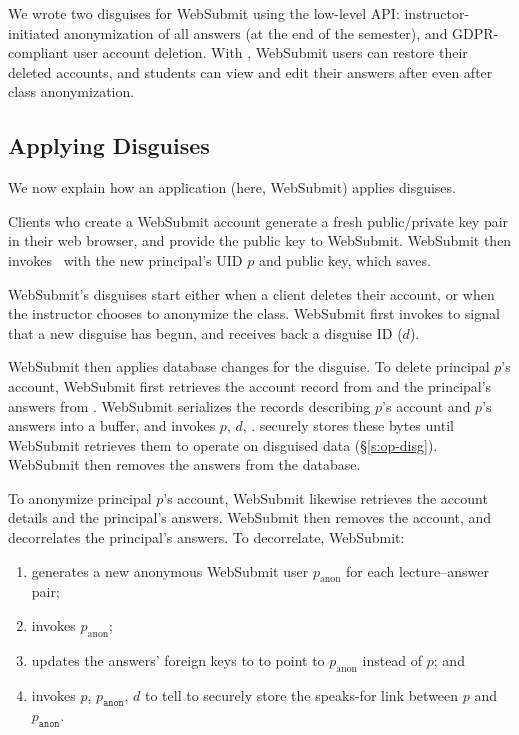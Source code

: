 %
We wrote two disguises for WebSubmit using the low-level API: \one{}
instructor-initiated anonymization of all answers (\eg at the end of the semester),
and \two{} GDPR-compliant user account deletion.
%
%
With \sys, WebSubmit users can restore their deleted accounts, and students can
view and edit their answers after even after class anonymization.
%

\subsection{Applying Disguises}
%
We now explain how an application (here, WebSubmit) applies disguises.
%

%
Clients who create a WebSubmit account generate a fresh public/private key pair
in their web browser, and provide the public key to WebSubmit.
%
WebSubmit then invokes  with the new principal's UID $p$
and public key, which \sys saves.
%

%
WebSubmit's disguises start either when a client deletes their account,
or when the instructor chooses to anonymize the class.
%
WebSubmit first invokes  to signal \sys that a new
disguise has begun, and receives back a disguise ID ($d$).
%

%
WebSubmit then applies database changes for the disguise.
%
To delete principal $p$'s account, WebSubmit first retrieves the account record
from  and the principal's answers from .
%
WebSubmit serializes the records describing $p$'s account and $p$'s answers into
a buffer, and invokes $p$, $d$, .
%
\sys securely stores these bytes until WebSubmit retrieves them to operate on
disguised data (\S\ref{s:op-disg}).
%
WebSubmit then removes the answers from the database.
%

%
To anonymize principal $p$'s account, WebSubmit likewise retrieves the account
details and the principal's answers.
%
WebSubmit then removes the account, and decorrelates the principal's answers.
%
To decorrelate, WebSubmit:
%
\begin{enumerate}[nosep]
%
\item generates a new anonymous WebSubmit user $p_{\textrm{anon}}$ for each
  lecture--answer pair;
%
\item invokes $p_{\textrm{anon}}$\fn{)};
%
\item updates the answers' foreign keys to  to point to
  $p_{\textrm{anon}}$ instead of $p$; and
%
\item invokes $p$, $p_{\texttt{anon}}$, $d$\fn{)} to tell
    \sys to securely store the speaks-for link between $p$ and $p_{\texttt{anon}}$.
\end{enumerate}
%

